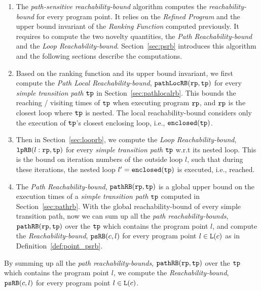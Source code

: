 \begin{enumerate}
\item The \emph{path-sensitive reachability-bound} algorithm computes the \emph{reachability-bound} for every program point.
It relies on the \emph{Refined Program} and the upper bound invariant of the \emph{Ranking Function} computed previously.
It requires to compute the two novelty quantities, the \emph{Path Reachability-bound} and the \emph{Loop Reachability-bound}.
Section~\ref{sec:psrb} introduces this algorithm and the following sections describe the computations. 
    \item Based on the ranking function and its upper bound invariant, we first compute the \emph{Path Local Reachability-bound}, $\mathtt{pathLocRB}(\mathtt{rp}, \mathtt{tp})$ for every \emph{simple transition path} $\mathtt{tp}$ in Section~\ref{sec:pathlocalrb}. 
    This bounds the reaching / visiting times of $\mathtt{tp}$ when executing program $\mathtt{rp}$, and $\mathtt{rp}$ is the closest loop where $\mathtt{tp}$ is nested.
    The local reachability-bound  considers only the execution of $\mathtt{tp}$'s closest enclosing loop, i.e., $\mathtt{enclosed}(\mathtt{tp})$.
    \item Then in Section~\ref{sec:looprb}, we compute the \emph{Loop Reachability-bound}, $\mathtt{lpRB}(l: \mathtt{rp}, \mathtt{tp})$ for every \emph{simple transition path} $\mathtt{tp}$
    w.r.t its nested loop. 
    This is the bound on iteration numbers of the outside loop $l$,
    such that during these iterations, the nested loop $l' = \mathtt{enclosed(\mathtt{tp})}$ is executed, i.e., reached.
    \item The \emph{Path Reachability-bound}, $\mathtt{pathRB}(\mathtt{rp}, \mathtt{tp})$  is a global upper bound on the execution times of a \emph{simple transition path} $\mathtt{tp}$ computed in Section~\ref{sec:pathrb}.
    With the global reachability-bound of every simple transition path, now we can sum up all the \emph{path reachability-bounds}, $\mathtt{pathRB}(\mathtt{rp}, \mathtt{tp})$ over the $\mathtt{tp}$ which contains the program point $l$, and compute the \emph{Reachability-bound}, $\mathtt{psRB}(c, l)$ for every program point $l \in \mathtt{L}(c)$ as in Definition~\ref{def:point_psrb}.
\end{enumerate}
By summing up all the \emph{path reachability-bounds}, $\mathtt{pathRB}(\mathtt{rp}, \mathtt{tp})$ over the $\mathtt{tp}$ which contains the program point $l$, we compute the \emph{Reachability-bound}, $\mathtt{psRB}(c, l)$ for every program point $l \in \mathtt{L}(c)$.